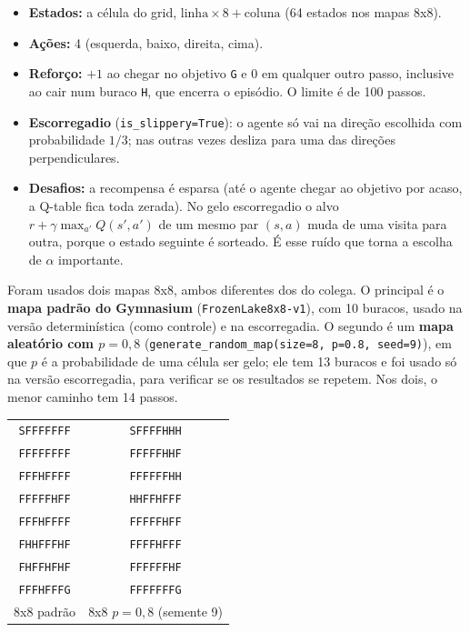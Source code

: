 \documentclass[11pt,a4paper]{article}
\begin{document}
\begin{itemize}
  \item \textbf{Estados:} a célula do grid, $\text{linha} \times 8 + \text{coluna}$ (64 estados nos mapas 8x8).
  \item \textbf{Ações:} 4 (esquerda, baixo, direita, cima).
  \item \textbf{Reforço:} $+1$ ao chegar no objetivo \texttt{G} e $0$ em qualquer outro passo, inclusive ao cair num
    buraco \texttt{H}, que encerra o episódio. O limite é de 100 passos.
  \item \textbf{Escorregadio} (\texttt{is\_slippery=True}): o agente só vai na direção escolhida com probabilidade
    $1/3$; nas outras vezes desliza para uma das direções perpendiculares.
  \item \textbf{Desafios:} a recompensa é esparsa (até o agente chegar ao objetivo por acaso, a Q-table fica toda
    zerada). No gelo escorregadio o alvo $r + \gamma\max_{a'}Q(s',a')$ de um mesmo par $(s,a)$ muda de uma visita para
    outra, porque o estado seguinte é sorteado. É esse ruído que torna a escolha de $\alpha$ importante.
\end{itemize}

Foram usados dois mapas 8x8, ambos diferentes dos do colega. O principal é o \textbf{mapa padrão do Gymnasium}
(\texttt{FrozenLake8x8-v1}), com 10 buracos, usado na versão determinística (como controle) e na escorregadia. O segundo é
um \textbf{mapa aleatório com $p = 0{,}8$} (\texttt{generate\_random\_map(size=8, p=0.8, seed=9)}), em que $p$ é a
probabilidade de uma célula ser gelo; ele tem 13 buracos e foi usado só na versão escorregadia, para verificar se os
resultados se repetem. Nos dois, o menor caminho tem 14 passos.

\begin{center}
\footnotesize
\renewcommand{\arraystretch}{0.8}
\begin{tabular}{cc}
\texttt{SFFFFFFF} & \texttt{SFFFFHHH}\\
\texttt{FFFFFFFF} & \texttt{FFFFFHHF}\\
\texttt{FFFHFFFF} & \texttt{FFFFFFHH}\\
\texttt{FFFFFHFF} & \texttt{HHFFHFFF}\\
\texttt{FFFHFFFF} & \texttt{FFFFFHFF}\\
\texttt{FHHFFFHF} & \texttt{FFFFHFFF}\\
\texttt{FHFFHFHF} & \texttt{FFFFFFHF}\\
\texttt{FFFHFFFG} & \texttt{FFFFFFFG}\\[0.3em]
8x8 padrão & 8x8 $p = 0{,}8$ (semente 9)
\end{tabular}
\end{center}
\end{document}
